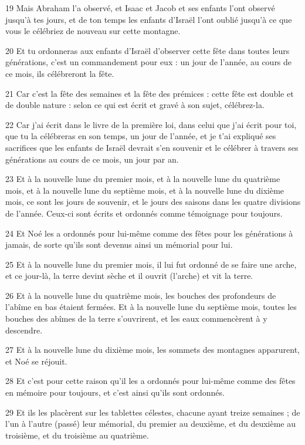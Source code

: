 \par 19 Mais Abraham l'a observé, et Isaac et Jacob et ses enfants l'ont observé jusqu'à tes jours, et de ton temps les enfants d'Israël l'ont oublié jusqu'à ce que vous le célébriez de nouveau sur cette montagne.
\par 20 Et tu ordonneras aux enfants d'Israël d'observer cette fête dans toutes leurs générations, c'est un commandement pour eux : un jour de l'année, au cours de ce mois, ils célébreront la fête.
\par 21 Car c'est la fête des semaines et la fête des prémices : cette fête est double et de double nature : selon ce qui est écrit et gravé à son sujet, célébrez-la.
\par 22 Car j'ai écrit dans le livre de la première loi, dans celui que j'ai écrit pour toi, que tu la célébreras en son temps, un jour de l'année, et je t'ai expliqué ses sacrifices que les enfants de Israël devrait s'en souvenir et le célébrer à travers ses générations au cours de ce mois, un jour par an.
\par 23 Et à la nouvelle lune du premier mois, et à la nouvelle lune du quatrième mois, et à la nouvelle lune du septième mois, et à la nouvelle lune du dixième mois, ce sont les jours de souvenir, et le jours des saisons dans les quatre divisions de l'année. Ceux-ci sont écrits et ordonnés comme témoignage pour toujours.
\par 24 Et Noé les a ordonnés pour lui-même comme des fêtes pour les générations à jamais, de sorte qu'ils sont devenus ainsi un mémorial pour lui.
\par 25 Et à la nouvelle lune du premier mois, il lui fut ordonné de se faire une arche, et ce jour-là, la terre devint sèche et il ouvrit (l'arche) et vit la terre.
\par 26 Et à la nouvelle lune du quatrième mois, les bouches des profondeurs de l'abîme en bas étaient fermées. Et à la nouvelle lune du septième mois, toutes les bouches des abîmes de la terre s'ouvrirent, et les eaux commencèrent à y descendre.
\par 27 Et à la nouvelle lune du dixième mois, les sommets des montagnes apparurent, et Noé se réjouit.
\par 28 Et c'est pour cette raison qu'il les a ordonnés pour lui-même comme des fêtes en mémoire pour toujours, et c'est ainsi qu'ils sont ordonnés.
\par 29 Et ils les placèrent sur les tablettes célestes, chacune ayant treize semaines ; de l'un à l'autre (passé) leur mémorial, du premier au deuxième, et du deuxième au troisième, et du troisième au quatrième.
